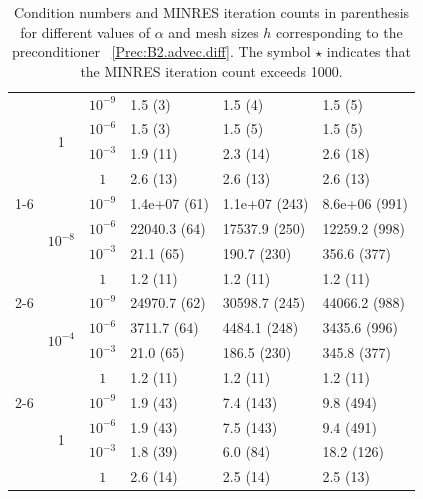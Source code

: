 \documentclass[11pt, reqno, a4paper, twoside]{article}
\numberwithin{equation}{section}
\numberwithin{remark}{section}
\numberwithin{figure}{section}
\numberwithin{table}{section}
\begin{document}
\begin{table}[t!]
{\begin{tabular}{|c|c|c|lll|}
& \multirow{4}{*}{1}
& $10^{-9}$ & 1.5 (3) & 1.5 (4) & 1.5 (5) \\
& & $10^{-6}$ & 1.5 (3) & 1.5 (5) & 1.5 (5) \\
& & $10^{-3}$ & 1.9 (11)  & 2.3 (14)  & 2.6 (18)  \\
& & $1$       & 2.6 (13)  & 2.6 (13)  & 2.6 (13)  \\


\cline{1-6}

\multirow{12}{*}{$10^{-1}$}
& \multirow{4}{*}{$10^{-8}$}
& $10^{-9}$ & 1.4e+07 (61) & 1.1e+07 (243) & 8.6e+06 (991) \\
& & $10^{-6}$ & 22040.3 (64) & 17537.9 (250) & 12259.2 (998) \\
& & $10^{-3}$ & 21.1 (65) & 190.7 (230) & 356.6 (377) \\
& & $1$       & 1.2 (11) & 1.2 (11) & 1.2 (11) \\

\cline{2-6}

& \multirow{4}{*}{$10^{-4}$}
& $10^{-9}$ & 24970.7 (62) & 30598.7 (245) & 44066.2 (988) \\
& & $10^{-6}$ &3711.7 (64) & 4484.1 (248) & 3435.6 (996) \\
& & $10^{-3}$ & 21.0 (65) & 186.5 (230) & 345.8 (377) \\
& & $1$       & 1.2 (11) & 1.2 (11) & 1.2 (11) \\

\cline{2-6}

& \multirow{4}{*}{1}
& $10^{-9}$ & 1.9 (43) & 7.4 (143) & 9.8 (494) \\
& & $10^{-6}$ & 1.9 (43) & 7.5 (143) & 9.4 (491) \\
& & $10^{-3}$ & 1.8 (39)  & 6.0 (84)  & 18.2 (126)  \\
& & $1$       & 2.6 (14)  & 2.5 (14)  & 2.5 (13)  \\

\hline
\end{tabular}}
\caption{Condition numbers and MINRES iteration counts in parenthesis for different values of \(\alpha\) and mesh sizes $h$ corresponding to the preconditioner~ \eqref{Prec:B2.advec.diff}. The symbol $\star$ indicates that the MINRES iteration count exceeds 1000.}\label{tab:advec.reac.diff}
\end{table}
\end{document}
